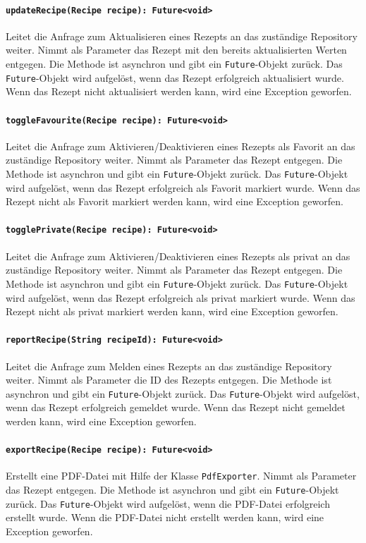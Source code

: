 \documentclass[parskip=full]{scrartcl}
\begin{document}
\paragraph{\texttt{updateRecipe(Recipe recipe): Future<void>}}
Leitet die Anfrage zum Aktualisieren eines Rezepts an das zuständige Repository weiter. Nimmt als Parameter das Rezept mit den bereits aktualisierten Werten entgegen. Die Methode ist asynchron und gibt ein \texttt{Future}-Objekt zurück. Das \texttt{Future}-Objekt wird aufgelöst, wenn das Rezept erfolgreich aktualisiert wurde. Wenn das Rezept nicht aktualisiert werden kann, wird eine Exception geworfen.
\paragraph{\texttt{toggleFavourite(Recipe recipe): Future<void>}}
Leitet die Anfrage zum Aktivieren/Deaktivieren eines Rezepts als Favorit an das zuständige Repository weiter. Nimmt als Parameter das Rezept entgegen. Die Methode ist asynchron und gibt ein \texttt{Future}-Objekt zurück. Das \texttt{Future}-Objekt wird aufgelöst, wenn das Rezept erfolgreich als Favorit markiert wurde. Wenn das Rezept nicht als Favorit markiert werden kann, wird eine Exception geworfen.
\paragraph{\texttt{togglePrivate(Recipe recipe): Future<void>}}
Leitet die Anfrage zum Aktivieren/Deaktivieren eines Rezepts als privat an das zuständige Repository weiter. Nimmt als Parameter das Rezept entgegen. Die Methode ist asynchron und gibt ein \texttt{Future}-Objekt zurück. Das \texttt{Future}-Objekt wird aufgelöst, wenn das Rezept erfolgreich als privat markiert wurde. Wenn das Rezept nicht als privat markiert werden kann, wird eine Exception geworfen.
\paragraph{\texttt{reportRecipe(String recipeId): Future<void>}}
Leitet die Anfrage zum Melden eines Rezepts an das zuständige Repository weiter. Nimmt als Parameter die ID des Rezepts entgegen. Die Methode ist asynchron und gibt ein \texttt{Future}-Objekt zurück. Das \texttt{Future}-Objekt wird aufgelöst, wenn das Rezept erfolgreich gemeldet wurde. Wenn das Rezept nicht gemeldet werden kann, wird eine Exception geworfen.
\paragraph{\texttt{exportRecipe(Recipe recipe): Future<void>}}
Erstellt eine PDF-Datei mit Hilfe der Klasse \texttt{PdfExporter}. Nimmt als Parameter das Rezept entgegen. Die Methode ist asynchron und gibt ein \texttt{Future}-Objekt zurück. Das \texttt{Future}-Objekt wird aufgelöst, wenn die PDF-Datei erfolgreich erstellt wurde. Wenn die PDF-Datei nicht erstellt werden kann, wird eine Exception geworfen.
\newpage
\end{document}
